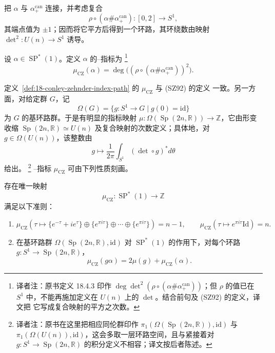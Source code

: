 把 $\alpha$ 与 $\alpha_+^{\mathrm{can}}$ 连接，并考虑复合
\[
 \rho\circ(\alpha\#\alpha_+^{\mathrm{can}}):[0,2]\longrightarrow S^1,
\]
其端点值为 $\pm1$；因而将它平方后得到一个环路，其环绕数由映射
$\det^2:U(n)\to S^1$ 诱导。

\begin{definition}
\label{def:18-conley-zehnder-index-path}
设 $\alpha\in\operatorname{SP}^*(1)$。定义 $\alpha$ 的\personConley{}--\personZehnder{}指标为
\footnote{译者注：原书定义 18.4.3 印作
$\deg\det^2(\rho\circ(\alpha\#\alpha_+^{\mathrm{can}}))$；但 $\rho$ 的值已在
$S^1$ 中，不能再施加定义在 $U(n)$ 上的 $\det$。结合前句及 (SZ92) 的定义，译文把
它写成复合映射的平方之次数。}
\[
 \mu_{\mathrm{CZ}}(\alpha)
 =\deg\bigl((\rho\circ(\alpha\#\alpha_+^{\mathrm{can}}))^2\bigr).
\]
\end{definition}

定义~\ref{def:18-conley-zehnder-index-path} 的 $\mu_{\mathrm{CZ}}$ 与 (SZ92) 的定义
一致。另一方面，对给定\personLie{}群 $G$，记
\[
 \Omega(G)=\{g:S^1\to G\mid g(0)=\mathrm{id}\}
\]
为 $G$ 的基环路群。于是有明显的指标映射
$\mu:\Omega(\operatorname{Sp}(2n,\mathbb R))\to\mathbb Z$，它由形变收缩
$\operatorname{Sp}(2n,\mathbb R)\simeq U(n)$ 及复合映射的次数定义；具体地，对
$g\in\Omega(U(n))$，该整数由
\[
 g\longmapsto\frac1{2\pi}\int_{S^1}(\det\circ g)^*d\theta
\]
给出。
\footnote{译者注：原书在这里把相应同伦群印作
$\pi_1(\Omega(\operatorname{Sp}(2n,\mathbb R)),\mathrm{id})$ 与
$\pi_1(\Omega(U(n)),\mathrm{id})$，这会多取一层环路空间，且与紧接着对
$g:S^1\to\operatorname{Sp}(2n,\mathbb R)$ 的积分定义不相容；译文按后者陈述。}
\personConley{}--\personZehnder{}指标 $\mu_{\mathrm{CZ}}$ 可由下列性质刻画。

\begin{proposition}[{(FH93) 中的命题 5}]
\label{prop:18-conley-zehnder-characterization}
存在唯一映射
\[
 \mu_{\mathrm{CZ}}:\operatorname{SP}^*(1)\longrightarrow\mathbb Z
\]
满足以下准则：
\begin{enumerate}[label=(\arabic*)]
\item {}
\[
 \mu_{\mathrm{CZ}}\!\left(\tau\mapsto
 \{e^{-\tau}+ie^\tau\}\oplus\{e^{\pi i\tau}\}\oplus\cdots\oplus
 \{e^{\pi i\tau}\}\right)=n-1,
 \qquad
 \mu_{\mathrm{CZ}}(\tau\mapsto e^{\pi i\tau}\mathrm{Id})=n.
\]
\item {} 在基环路群
$\Omega(\operatorname{Sp}(2n,\mathbb R),\mathrm{id})$ 对
$\operatorname{SP}^*(1)$ 的作用下，对每个环路
$g:S^1\to\operatorname{Sp}(2n,\mathbb R)$，
\[
 \mu_{\mathrm{CZ}}(g\alpha)=2\mu(g)+\mu_{\mathrm{CZ}}(\alpha).
\]
\end{enumerate}
\end{proposition}

